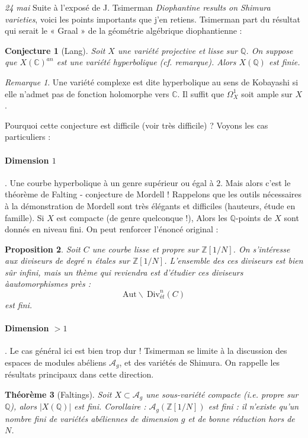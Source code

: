 \documentclass[11.8pt]{amsart}
\newcommand\Q{\mathbb Q}
\newcommand\C{\mathbb C}
\newcommand\Z{\mathbb{Z}}
\theoremstyle{plain}
\newtheorem{thm}{Théorème}[section]
\newtheorem{prop}[thm]{Proposition}
\newtheorem{conj}[thm]{Conjecture}
\theoremstyle{definition}
\theoremstyle{remark}
\newtheorem*{rmq}{Remarque}
\begin{document}
\textsl{24 mai} \quad Suite à l'exposé de J. Tsimerman \textit{Diophantine results on Shimura varieties}, voici les points importants que j'en retiens. Tsimerman part du résultat qui serait le  « Graal » de la géométrie algébrique diophantienne : 
\begin{conj}[Lang] Soit $X$ une variété projective et lisse sur $\Q$. On suppose que $X(\C)^{an}$ est une variété \textit{hyperbolique} (cf. remarque). Alors $X(\Q)$ est finie. 
\end{conj}

\begin{rmq} Une variété complexe est dite hyperbolique au sens de Kobayashi si elle n'admet pas de fonction holomorphe vers $\C$. Il suffit que $\Omega_X^1$ soit ample sur $X$. 
\end{rmq}

Pourquoi cette conjecture est difficile (voir très difficile) ? Voyons les cas particuliers :

\paragraph{Dimension $1$}. Une courbe hyperbolique à un genre supérieur ou égal à $2$. Mais alors c'est le théorème de Falting - conjecture de Mordell ! Rappelons que les outils nécessaires à la démonstration de Mordell sont très élégants et difficiles (hauteurs, étude en famille). Si $X$ est compacte (de genre quelconque !), Alors les $\Q$-points de $X$ sont donnés en niveau fini. On peut renforcer l'énoncé original :

\begin{prop} Soit $C$ une courbe lisse et propre sur $\Z[1/N]$. On s'intéresse aux diviseurs de degré $n$ étales sur $\Z[1/N]$. L'ensemble des ces diviseurs est bien sûr infini, mais un thème qui reviendra est d'étudier ces diviseurs à\textit{automorphismes près} : $$\mathrm{Aut}\backslash \ \mathrm{Div}^n_{ét}(C)$$
est fini.
\end{prop}

\paragraph{Dimension $>1$}. Le cas général ici est bien trop dur ! Tsimerman se limite à la discussion des espaces de modules abéliens $\mathcal A_g$, et des variétés de Shimura. On rappelle les résultats principaux dans cette direction. 

\begin{thm}[Faltings] Soit $X\subset \mathcal A_g$ une sous-variété compacte (i.e. propre sur $\Q$), alors $|X(\Q)|$ est fini. Corollaire : $\mathcal A_g(\Z[1/N])$ est fini : il n'existe qu'un nombre fini de variétés abéliennes de dimension $g$ et de bonne réduction hors de $N$. 
\end{thm}
\end{document}
